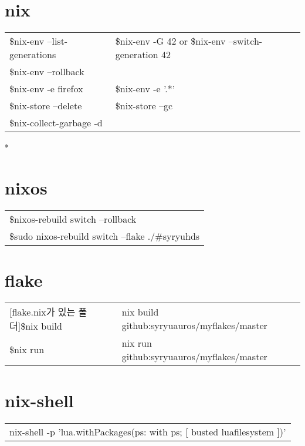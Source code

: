 \documentclass[11pt]{article}
\author{JJ Kim}
\date{\today}
\title{}
\begin{document}
\tableofcontents


\section{nix}
\label{sec:org9eb5227}
\begin{center}
\begin{tabular}{ll}
\$nix-env --list-generations & \$nix-env -G 42  or \$nix-env --switch-generation 42\\
\$nix-env --rollback & \\
\$nix-env -e firefox & \$nix-env -e '.*'\\
\$nix-store --delete & \$nix-store --gc\\
\$nix-collect-garbage -d & \\
\end{tabular}
\end{center}
*
\section{nixos}
\label{sec:org368b7e3}
\begin{center}
\begin{tabular}{l}
\$nixos-rebuild switch --rollback\\
[flake.nix가 있는 폴더]\$sudo nixos-rebuild switch --flake ./\#syryuhds\\
\end{tabular}
\end{center}
\section{flake}
\label{sec:org386151b}
\begin{center}
\begin{tabular}{ll}
[flake.nix가 있는 폴더]\$nix build & nix build  github:syryuauros/myflakes/master\\
[flake.nix가 있는 폴더]\$nix run & nix run  github:syryuauros/myflakes/master\\
\end{tabular}
\end{center}
\section{nix-shell}
\label{sec:orgc828b1e}
\begin{center}
\begin{tabular}{l}
nix-shell -p 'lua.withPackages(ps: with ps; [ busted luafilesystem ])'\\
\end{tabular}
\end{center}
\end{document}
